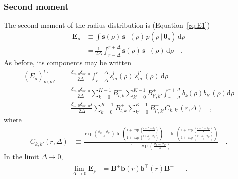 \documentclass[modern]{aastex62}
\begin{document}
\subsubsection{Second moment}
%
The second moment of the radius distribution is (Equation~\ref{eq:E1})
%
\begin{align}
    \mathbf{E}_\rho
     & \equiv
    \int
    \mathbf{s}(\rho) \,
    \mathbf{s}^\top(\rho) \,
    p(\rho \, \big| \, \pmb{\theta}_{\rho}) \,
    \mathrm{d}\rho
    \nonumber \\
     & =
    \frac{1}{2\Delta}
    \int_{r - \Delta}^{r + \Delta}
    \mathbf{s}(\rho) \,
    \mathbf{s}^\top(\rho) \,
    \mathrm{d}\rho
    \quad.
\end{align}
%
As before, its components may be written
%
%
\begin{align}
    (E_\rho)^{l,l'}_{m,m'}
     & =
    \frac{\delta_{m,0}\delta_{m',0}}{2\Delta}
    \int_{r - \Delta}^{r + \Delta}
    \tilde{s}^l_{m}(\rho) \,
    \tilde{s}^{l'}_{m'}(\rho) \,
    \mathrm{d}\rho
    \nonumber \\
     & =
    \frac{\delta_{m,0}\delta_{m',0}}{2\Delta}
    \sum_{k=0}^{K-1} B^+_{l,k}
    \sum_{k'=0}^{K-1} B^+_{l',k'}
    \int_{r - \Delta}^{r + \Delta}
    b_{k}(\rho)
    b_{k'}(\rho)
    \mathrm{d}\rho
    \nonumber \\
     & =
    \frac{\delta_{m,0}\delta_{m',0}s}{2\Delta}
    \sum_{k=0}^{K-1} B^+_{l,k}
    \sum_{k'=0}^{K-1} B^+_{l',k'}
    C_{k,k'}(r,\Delta)
    \quad,
\end{align}
%
where
%
\begin{align}
    C_{k,k'}(r,\Delta)
     & \equiv
    \frac{
        \exp\left(\frac{\vartheta_{k} - \vartheta_{k'}}{s}\right)
        \ln
        \left(
        \frac{
            1+\exp\left(\frac{r -\Delta -\vartheta_{k}}{s}\right)
        }
        {
            1+\exp\left(\frac{r + \Delta -\vartheta_{k}}{s}\right)
        }
        \right)
        -
        \ln
        \left(
        \frac{
            1+\exp\left(\frac{r -\Delta -\vartheta_{k'}}{s}\right)
        }
        {
            1+\exp\left(\frac{r + \Delta -\vartheta_{k'}}{s}\right)
        }
        \right)
    }{
        1
        -
        \exp\left(\frac{\vartheta_{k} - \vartheta_{k'}}{s}\right)
    }
    \quad.
\end{align}
%
In the limit $\Delta \rightarrow 0$,
%
\begin{align}
    \lim_{\Delta \rightarrow 0}
    \mathbf{E}_\rho
     & =
    \mathbf{B}^+ \mathbf{b}(r) \mathbf{b}^\top(r) {\mathbf{B}^+}^\top
    \quad.
\end{align}
%
\end{document}
